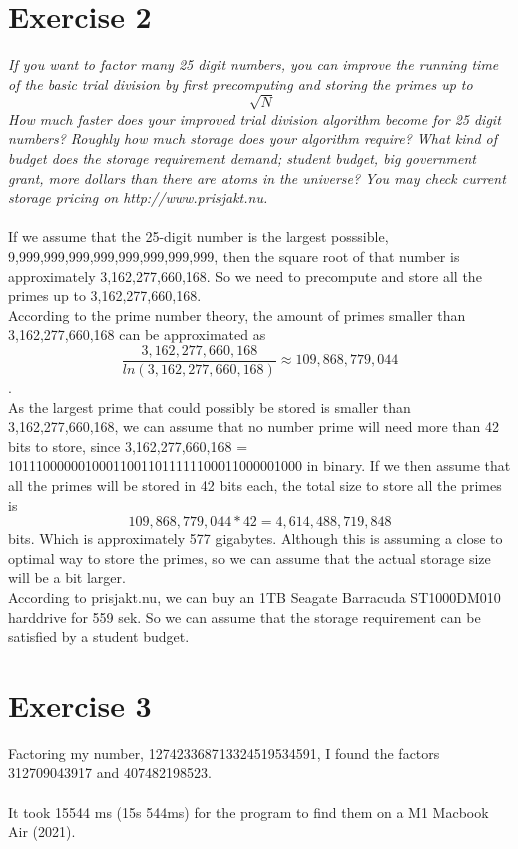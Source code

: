 \documentclass[12pt]{article}
\begin{document}
\section*{Exercise 2}
\textit{ If you want to factor many 25 digit numbers, you can improve the running time of the basic trial division by first precomputing and storing the primes up to \[\sqrt[]{N}\] How much faster does your improved trial division algorithm become for 25 digit numbers? Roughly how much storage does your algorithm require? What kind of budget does the storage requirement demand; student budget, big government grant, more dollars than there are atoms in the universe? You may check current storage pricing on http://www.prisjakt.nu.}
\\
\\
If we assume that the 25-digit number is the largest posssible, 9,999,999,999,999,999,999,999,999, then the square root of that number is approximately 3,162,277,660,168. So we need to precompute and store all the primes up to 3,162,277,660,168.
\\
According to the prime number theory\cite{wiki:primetheorem}, the amount of primes smaller than 3,162,277,660,168 can be approximated as \[ \frac{3,162,277,660,168}{ln(3,162,277,660,168)} \approx 109,868,779,044 \].
\\
As the largest prime that could possibly be stored is smaller than 3,162,277,660,168, we can assume that no number prime will need more than 42 bits to store, since 3,162,277,660,168 = 101110000001000110011011111100011000001000 in binary.
If we then assume that all the primes will be stored in 42 bits each, the total size to store all the primes is \[ 109,868,779,044 * 42 = 4,614,488,719,848 \] bits. Which is approximately 577 gigabytes.
Although this is assuming a close to optimal way to store the primes, so we can assume that the actual storage size will be a bit larger.
\\
According to prisjakt.nu, we can buy an 1TB Seagate Barracuda ST1000DM010 harddrive for 559 sek. So we can assume that the storage requirement can be satisfied by a student budget.

\newpage

\section*{Exercise 3}
Factoring my number, 127423368713324519534591, I found the factors 312709043917 and 407482198523.
\\\\
It took 15544 ms (15s 544ms) for the program to find them on a M1 Macbook Air (2021).
\end{document}
